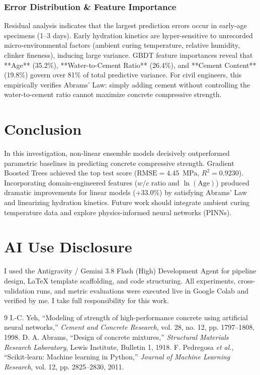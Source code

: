 \documentclass[10pt,conference,a4paper]{IEEEtran}
\begin{document}
\subsubsection{Error Distribution \& Feature Importance}
Residual analysis indicates that the largest prediction errors occur in early-age specimens (1--3 days). Early hydration kinetics are hyper-sensitive to unrecorded micro-environmental factors (ambient curing temperature, relative humidity, clinker fineness), inducing large variance. GBDT feature importances reveal that **Age** (35.2\%), **Water-to-Cement Ratio** (26.4\%), and **Cement Content** (19.8\%) govern over 81\% of total predictive variance. For civil engineers, this empirically verifies Abrams' Law: simply adding cement without controlling the water-to-cement ratio cannot maximize concrete compressive strength.

\section{Conclusion}
In this investigation, non-linear ensemble models decisively outperformed parametric baselines in predicting concrete compressive strength. Gradient Boosted Trees achieved the top test score ($\text{RMSE} = 4.45$~MPa, $R^2 = 0.9230$). Incorporating domain-engineered features ($w/c$ ratio and $\ln(\text{Age})$) produced dramatic improvements for linear models (+33.0\%) by satisfying Abrams' Law and linearizing hydration kinetics. Future work should integrate ambient curing temperature data and explore physics-informed neural networks (PINNs).

\section*{AI Use Disclosure}
I used the Antigravity / Gemini 3.8 Flash (High) Development Agent for pipeline design, LaTeX template scaffolding, and code structuring. All experiments, cross-validation runs, and metric evaluations were executed live in Google Colab and verified by me. I take full responsibility for this work.

\begin{thebibliography}{9}
I.-C. Yeh, ``Modeling of strength of high-performance concrete using artificial neural networks,'' \emph{Cement and Concrete Research}, vol. 28, no. 12, pp. 1797--1808, 1998.
D. A. Abrams, ``Design of concrete mixtures,'' \emph{Structural Materials Research Laboratory}, Lewis Institute, Bulletin 1, 1918.
F. Pedregosa \emph{et al.}, ``Scikit-learn: Machine learning in Python,'' \emph{Journal of Machine Learning Research}, vol. 12, pp. 2825--2830, 2011.
\end{thebibliography}
\end{document}
